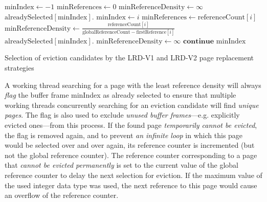 \begin{@empty}
    \begin{algorithm}[h]
        \scriptsize
        \begin{algorithmic}[1]
                \State $\text{minIndex} \gets -1$
                \State $\text{minReferences} \gets 0$
                \State $\text{minReferenceDensity} \gets \infty$
                                \State $\text{alreadySelected}\left[\text{minIndex}\right].$
                                \State $\text{minIndex} \gets i$
                                \State $\text{minReferences} \gets \text{referenceCount}\left[i\right]$
                                \State $\text{minReferenceDensity} \gets \frac{\text{referenceCount}\left[i\right]}{\text{globalReferenceCount} - \text{firstReference}\left[i\right]}$
                            \EndIf
                        \EndIf
                    \EndFor
                        \State $\text{alreadySelected}\left[\text{minIndex}\right].$
                        \State $\text{minReferenceDensity} \gets \infty$
                        \State $\textbf{continue}$
                    \Else
                        \State \Return $\text{minIndex}$
                    \EndIf
                \EndWhile
            \EndFunction
        \end{algorithmic}
        \vspace{1em}
        \caption[{\footnotesize \textbf{function} \textsc{select}} of LRD]{Selection of eviction candidates by the LRD-V1 and LRD-V2 page replacement strategies}
        \label{alg:lrdselect}
    \end{algorithm}
\end{@empty}

    A working thread searching for a page with the least reference density will always \emph{flag} the buffer frame {\scriptsize minIndex} as already selected to ensure that multiple working threads concurrently searching for an eviction candidate will find \emph{unique pages}. The flag is also used to exclude \emph{unused buffer frames}---e.g. explicitly evicted ones---from this process. If the found page \emph{temporarily cannot be evicted}, the flag is removed again, and to prevent \emph{an infinite loop} in which this page would be selected over and over again, its reference counter is incremented (but not the global reference counter). The reference counter corresponding to a page that \emph{cannot be evicted permanently} is set to the current value of the global reference counter to delay the next selection for eviction. If the maximum value of the used integer data type was used, the next reference to this page would cause an overflow of the reference counter.

